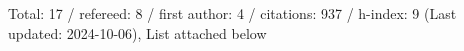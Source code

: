 Total: 17 / refereed: 8 / first author: 4 / citations: 937 / h-index: 9 (Last updated: 2024-10-06), List attached below